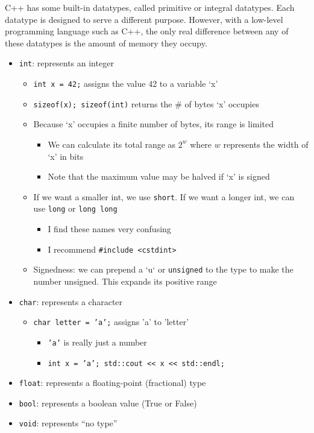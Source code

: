\documentclass{article}
\begin{document}
\vspace{1em}	
	\noindent
	C++ has some built-in datatypes, called primitive or integral datatypes. Each datatype is designed to serve a different purpose. However, with a low-level programming language such as C++, the only real difference between any of these datatypes is the amount of memory they occupy.
\begin{itemize}
	\item \texttt{int}: represents an integer
		\begin{itemize}
			\item \texttt{int x = 42;} assigns the value 42 to a variable `x'
			\item \texttt{sizeof(x); sizeof(int)} returns the \# of bytes `x' occupies
			\item Because `x' occupies a finite number of bytes, its range is limited
			\begin{itemize}
				\item We can calculate its total range as $2^w$ where $w$ represents the width of `x' in bits
				\item Note that the maximum value may be halved if `x' is signed
			\end{itemize}
			\item If we want a smaller int, we use \texttt{short}. If we want a longer int, we can use \texttt{long} or \texttt{long long}
			\begin{itemize}
				\item I find these names very confusing
				\item I recommend \texttt{\#include <cstdint>}
			\end{itemize}
			\item Signedness: we can prepend a `u` or \texttt{unsigned} to the type to make the number unsigned. This expands its positive range
		\end{itemize}
		\item \texttt{char}: represents a character
		\begin{itemize}
			\item \texttt{char letter = 'a';} assigns 'a' to 'letter'
				\begin{itemize}
					\item \texttt{'a'} is really just a number
					\item \texttt{int x = 'a'; std::cout << x << std::endl;}
				\end{itemize}
		\end{itemize}
		\item \texttt{float}: represents a floating-point (fractional) type
		\item \texttt{bool}: represents a boolean value (True or False)
		\item \texttt{void}: represents ``no type''
	\end{itemize}
\end{document}
